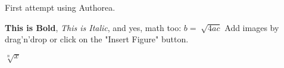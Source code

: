 First attempt using Authorea.

\textbf{This is Bold}, \textit{This is Italic}, and yes, math too: $ b= \sqrt[]{4ac}$ Add images by drag'n'drop or click on the "Insert Figure" button.

$\sqrt[n]{x}$